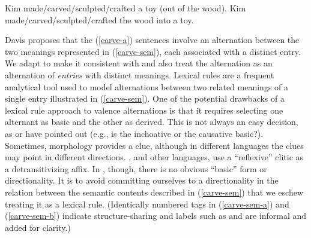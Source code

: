 \documentclass[output=paper
 	        ,biblatex
                ,babelshorthands
                ,newtxmath
                ,draftmode
                ,colorlinks, citecolor=brown
]{langscibook}
\begin{document}
\begin{exe}
\ex\label{carve}
\begin{xlist}
	\ex\label{carve-a} Kim made/carved/sculpted/crafted a toy (out of the wood).
	\ex\label{carve-b} Kim made/carved/sculpted/crafted the wood into a toy.
\end{xlist}
\end{exe}

\noindent
Davis proposes that the (\ref{carve-a}) sentences involve an alternation between the two meanings represented in (\ref{carve-sem}), each associated with a distinct entry. We adapt \citet{Davis2001} to make it consistent with \citet{KoenigandDavis2006} and also treat the alternation as an alternation of \emph{entries} with distinct meanings. 
Lexical rules are a frequent analytical tool used to model alternations between two related meanings
of a single entry illustrated in (\ref{carve-sem}). One of the potential drawbacks of a lexical rule
approach to valence alternations is that it requires selecting one alternant as basic and the other
as derived. This is not always an easy decision, as \citet[731--732]{Goldberg1991} or
\citet{LevinandRappaport1994} have pointed out (e.g., is the inchoative or the causative
basic?). Sometimes, morphology provides a clue, although in different languages the clues may point
in different directions.  , and other  languages, use a ``reflexive''
clitic as a detransitivizing affix.  In , though, there is no obvious ``basic'' form or
directionality. It is to avoid committing ourselves to a directionality in the relation between the
semantic contents described in (\ref{carve-sem}) that we eschew treating it as a lexical
rule. (Identically numbered tags in (\ref{carve-sem-a}) and (\ref{carve-sem-b}) indicate
structure-sharing and labels such as  and  are informal and added for clarity.)


\end{document}

